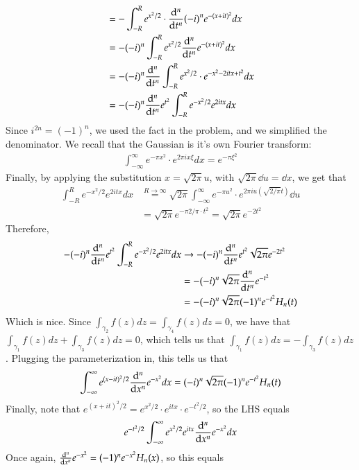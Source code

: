 \documentclass[12pt]{article}
\theoremstyle{definition}
\theoremstyle{remark}
\begin{document}
\begin{enumerate}[leftmargin=\labelsep]
\begin{align*}
			&= -\int_{-R}^R e^{x^2/2} \cdot \dv[n]{t} (-i)^n e^{-(x+it)^2}dx \\
			&= -(-i)^n \int_{-R}^R e^{x^2/2} \dv[n]{t} e^{-(x+it)^2}dx \\
			&= -(-i)^n \dv[n]{t} \int_{-R}^R e^{x^2/2} \cdot e^{-x^2-2itx+t^2}dx \\
			&= -(-i)^n \dv[n]{t} e^{t^2} \int_{-R}^R e^{-x^2/2}e^{2itx}dx
		\end{align*}
		Since $i^{2n} = (-1)^n$, we used the fact in the problem, and we simplified the denominator. We recall that the Gaussian is it's own Fourier transform:
		\begin{align*}
			\int_{-\infty}^\infty e^{-\pi x^2} \cdot e^{2\pi i x \xi} dx = e^{-\pi \xi^2}
		\end{align*}
		Finally, by applying the substitution $x = \sqrt{2\pi}u$, with $\sqrt{2\pi} \dd u = \dd x$, we get that
		\begin{align*}
			\int_{-R}^R e^{-x^2/2}e^{2itx}dx &\overset{R \to \infty}{=} \sqrt{2\pi} \int_{-\infty}^{\infty} e^{-\pi u^2} \cdot e^{2\pi i u (\sqrt{2/\pi} t)} \dd u \\
			&= \sqrt{2\pi} e^{-\pi 2/ \pi \cdot t^2} = \sqrt{2\pi} e^{-2t^2}
		\end{align*}
		Therefore,
		\begin{align*}
			-(-i)^n \dv[n]{t} e^{t^2} \int_{-R}^R e^{-x^2/2}e^{2itx}dx &\to -(-i)^n \dv[n]{t} e^{t^2} \sqrt{2\pi} e^{-2t^2} \\
			&= -(-i)^n \sqrt{2\pi} \dv[n]{t} e^{-t^2} \\
			&= -(-i)^n \sqrt{2\pi} (-1)^n e^{-t^2} H_n(t)
		\end{align*}
		Which is nice. Since $\int_{\gamma_2} f(z)dz = \int_{\gamma_4} f(z)dz = 0$, we have that $\int_{\gamma_1} f(z)dz + \int_{\gamma_3} f(z)dz = 0$, which tells us that $\int_{\gamma_1} f(z)dz = -\int_{\gamma_3} f(z)dz$. Plugging the parameterization in, this tells us that
		\begin{align*}
			\int_{-\infty}^\infty e^{(x-it)^2/2} \dv[n]{x} e^{-x^2}dx = (-i)^n \sqrt{2\pi} (-1)^n e^{-t^2} H_n(t)
		\end{align*}
		Finally, note that $e^{(x+it)^2/2} = e^{x^2/2} \cdot e^{itx} \cdot e^{-t^2/2}$, so the LHS equals
		\begin{align*}
			e^{-t^2/2} \int_{-\infty}^{\infty} e^{x^2/2} e^{itx} \dv[n]{x} e^{-x^2}dx
		\end{align*}
		Once again, $\dv[n]{x} e^{-x^2} = (-1)^n e^{-x^2}H_n(x)$, so this equals
		\begin{align*}

\end{align*}
\end{enumerate}
\end{document}

